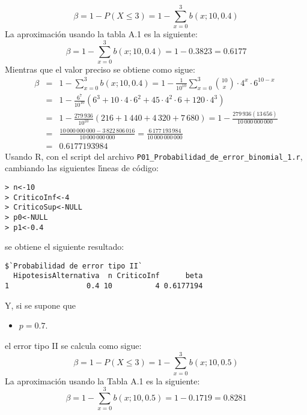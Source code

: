 \begin{solucion}
\begin{enumerate}
  \begin{equation*}
   \beta = 1 - P(X \leq 3) = 1 - \sum_{x=0}^3 b(x;10,0.4)
  \end{equation*}
  La aproximaci\'on usando la tabla A.1 es la siguiente:
  \begin{equation*}
   \beta = 1 - \sum_{x=0}^3 b(x;10,0.4) = 1 - 0.3823 = 0.6177
  \end{equation*}
  Mientras que el valor preciso se obtiene como sigue:
  \begin{eqnarray*}
   \beta & = & 1 - \sum_{x=0}^3 b(x;10,0.4) = 1 - \frac{1}{10^{10}} \sum_{x=0}^{3} \binom{10}{x} \cdot 4^x \cdot 6^{10-x} \\
   & = & 1 - \frac{6^7}{10^{10}} \left( 6^3 + 10 \cdot 4 \cdot 6^2 + 45 \cdot 4^2 \cdot 6 + 120 \cdot 4^3 \right) \\
   & = & 1 - \frac{279\,936}{10^{10}}(216 + 1\,440 + 4\,320 + 7\,680) = 1 - \frac{279\,936(13\,656)}{10\,000\,000\,000} \\
   & = & \frac{10\,000\,000\,000 - 3\,822\,806\,016}{10\,000\,000\,000} = \frac{6\,177\,193\,984}{10\,000\,000\,000} \\
   & = & 0.6177193984
  \end{eqnarray*}
  Usando R, con el script del archivo \texttt{P01\_Probabilidad\_de\_error\_binomial\_1.r}, cambiando las siguientes l\'{\i}neas de c\'odigo:
  \begin{verbatim}
> n<-10
> CriticoInf<-4
> CriticoSup<-NULL
> p0<-NULL
> p1<-0.4
  \end{verbatim}
  \vspace{-0.5cm}
  se obtiene el siguiente resultado:
  \begin{verbatim}
$`Probabilidad de error tipo II`
  HipotesisAlternativa  n CriticoInf      beta
1                  0.4 10          4 0.6177194
  \end{verbatim}
  \vspace{-0.5cm}
  Y, si se supone que
  \begin{itemize}
   \item $p = 0.7$.
  \end{itemize}
  el error tipo II se calcula como sigue:
  \begin{equation*}
   \beta = 1 - P(X \leq 3) = 1 - \sum_{x=0}^3 b(x;10,0.5)
  \end{equation*}
  La aproximaci\'on usando la Tabla A.1 es la siguiente:
  \begin{equation*}
   \beta = 1 - \sum_{x=0}^3 b(x;10,0.5) = 1 - 0.1719 = 0.8281
  \end{equation*}

\end{enumerate}
\end{solucion}
